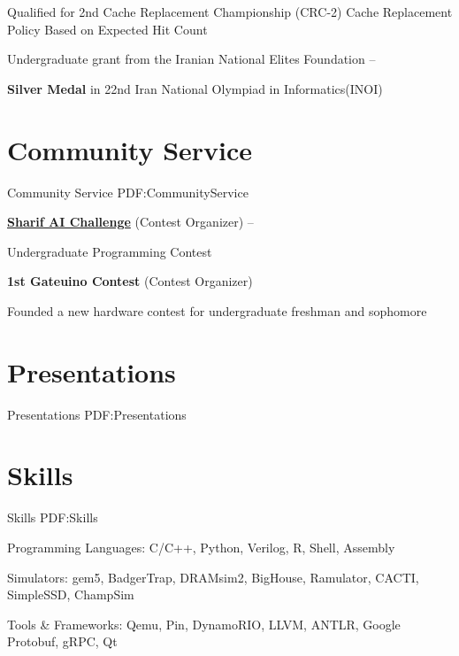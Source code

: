 \documentclass[a4paper,9pt,oneside]{article}
\begin{document}
\begin{body}
\BulletItem
Qualified for 2nd Cache Replacement Championship (CRC-2)
\SubBulletItem
Cache Replacement Policy Based on Expected Hit Count
\hfill
{}

\BulletItem
Undergraduate grant from the Iranian National Elites Foundation
\hfill
{} -- 

\BulletItem
\textbf{Silver Medal} in 22nd Iran National Olympiad in Informatics(INOI)
\hfill
{}




\section
{Community Service}
{Community Service}
{PDF:CommunityService}

\BulletItem
\href{https://github.com/SharifAIChallenge}{
\textbf{Sharif AI Challenge}} (Contest Organizer)
\hfill
{} --

\SubBulletItem
Undergraduate Programming Contest

\BulletItem
\textbf{1st Gateuino Contest} (Contest Organizer)
\hfill
{}

\SubBulletItem
Founded a new hardware contest for undergraduate freshman and sophomore

\section
{Presentations}
{Presentations}
{PDF:Presentations}



\section
{Skills}
{Skills}
{PDF:Skills}

\BulletItem
Programming Languages:
C/C++,
Python,
Verilog,
R,
Shell,
Assembly

\BulletItem
Simulators:
gem5,
BadgerTrap,
DRAMsim2,
BigHouse,
Ramulator,
CACTI,
SimpleSSD,
ChampSim

\BulletItem
Tools \& Frameworks:
Qemu,
Pin,
DynamoRIO,
LLVM,
ANTLR,
Google Protobuf,
gRPC,
Qt


\end{body}
\end{document}
